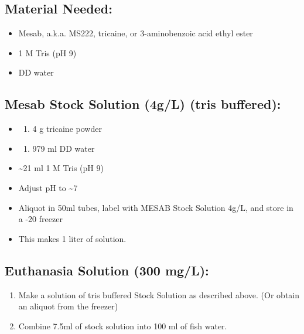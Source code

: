 \documentclass[
]{book}
\providecommand{\tightlist}{%
  \setlength{\itemsep}{0pt}\setlength{\parskip}{0pt}}
\begin{document}
\hypertarget{material-needed-3}{%
\subsection{Material Needed:}\label{material-needed-3}}

\begin{itemize}
\tightlist
\item
  Mesab, a.k.a. MS222, tricaine, or 3-aminobenzoic acid ethyl ester
\item
  1 M Tris (pH 9)
\item
  DD water
\end{itemize}

\hypertarget{mesab-stock-solution-4gl-tris-buffered}{%
\subsection{Mesab Stock Solution (4g/L) (tris buffered):}\label{mesab-stock-solution-4gl-tris-buffered}}

\begin{itemize}
\item
  \begin{enumerate}
  \def\labelenumi{\arabic{enumi}.}
  \tightlist
  \item
    4 g tricaine powder
  \end{enumerate}
\item
  \begin{enumerate}
  \def\labelenumi{\arabic{enumi}.}
  \setcounter{enumi}{1}
  \tightlist
  \item
    979 ml DD water
  \end{enumerate}
\item
  \textasciitilde21 ml 1 M Tris (pH 9)
\item
  Adjust pH to \textasciitilde7\\
\item
  Aliquot in 50ml tubes, label with MESAB Stock Solution 4g/L, and store in a -20 freezer
\item
  This makes 1 liter of solution.
\end{itemize}

\hypertarget{euthanasia-solution-300-mgl}{%
\subsection{Euthanasia Solution (300 mg/L):}\label{euthanasia-solution-300-mgl}}

\begin{enumerate}
\def\labelenumi{\arabic{enumi}.}
\tightlist
\item
  Make a solution of tris buffered Stock Solution as described above. (Or obtain an aliquot from the freezer)
\item
  Combine 7.5ml of stock solution into 100 ml of fish water.
\end{enumerate}
\end{document}

